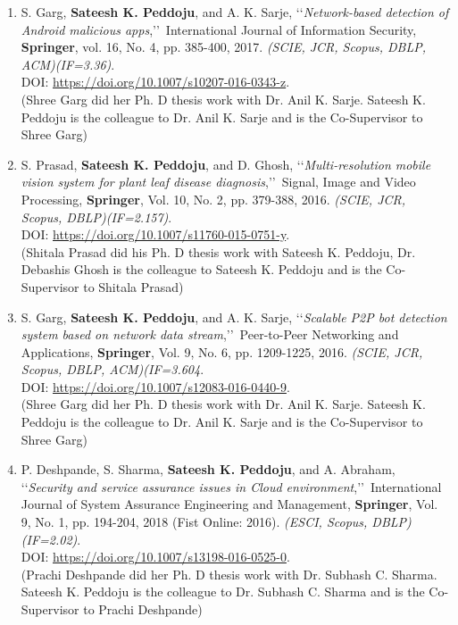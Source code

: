\begin{enumerate}
	\item
	S. Garg, \textbf{Sateesh K. Peddoju}, and A. K. Sarje, \lq\lq \textit{Network-based detection of Android malicious apps},\rq\rq\, International Journal of Information Security, \textbf{Springer}, vol. 16, No. 4, pp. 385-400, 2017. \emph{(SCIE, JCR, Scopus, DBLP, ACM)(IF=3.36)}. \\DOI: \url{https://doi.org/10.1007/s10207-016-0343-z}. \\(Shree Garg did her Ph. D thesis work with Dr. Anil K. Sarje.  Sateesh K. Peddoju is the colleague to Dr. Anil K. Sarje and is the Co-Supervisor to Shree Garg)
	
	\item
	S. Prasad, \textbf{Sateesh K. Peddoju}, and D. Ghosh, \lq\lq \textit{Multi-resolution mobile vision system for plant leaf disease diagnosis},\rq\rq\, Signal, Image and Video Processing, \textbf{Springer}, Vol. 10, No. 2, pp. 379-388, 2016. \emph{(SCIE, JCR,  Scopus, DBLP)(IF=2.157)}. \\DOI: \url{https://doi.org/10.1007/s11760-015-0751-y}.  \\(Shitala Prasad did his Ph. D thesis work with Sateesh K. Peddoju, Dr. Debashis Ghosh is the colleague to Sateesh K. Peddoju and is the Co-Supervisor to Shitala Prasad)
	
	\item
	S. Garg, \textbf{Sateesh K. Peddoju}, and A. K. Sarje, \lq\lq \textit{Scalable P2P bot detection system based on network data stream},\rq\rq\, Peer-to-Peer Networking and Applications, \textbf{Springer}, Vol. 9, No. 6, pp. 1209-1225, 2016. \emph{(SCIE, JCR, Scopus, DBLP, ACM)(IF=3.604}. \\DOI: \url{https://doi.org/10.1007/s12083-016-0440-9}. \\(Shree Garg did her Ph. D thesis work with Dr. Anil K. Sarje.  Sateesh K. Peddoju is the colleague to Dr. Anil K. Sarje and is the Co-Supervisor to Shree Garg)
	
	\item
	P. Deshpande, S. Sharma, \textbf{Sateesh K. Peddoju}, and A. Abraham, \lq\lq \textit{Security and service assurance issues in Cloud environment},\rq\rq\, International Journal of System Assurance Engineering and Management, \textbf{Springer}, Vol. 9, No. 1, pp. 194-204, 2018 (Fist Online: 2016). \emph{(ESCI, Scopus, DBLP)(IF=2.02)}. \\DOI: \url{https://doi.org/10.1007/s13198-016-0525-0}.  \\(Prachi Deshpande did her Ph. D thesis work with Dr. Subhash C. Sharma. Sateesh K. Peddoju is the colleague to Dr. Subhash C. Sharma and is the Co-Supervisor to Prachi Deshpande)
	

\end{enumerate}
